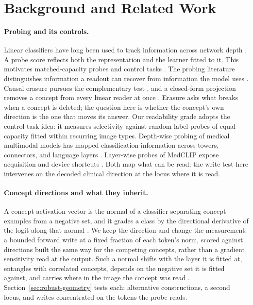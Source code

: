 \documentclass{article}
\begin{document}
\section{Background and Related Work}
\label{sec:related}

\paragraph{Probing and its controls.}
Linear classifiers have long been used to track information across network depth \citep{alain2017understanding}. A probe score reflects both the representation and the learner fitted to it. This motivates matched-capacity probes and control tasks \citep{hewitt2019designing}. The probing literature distinguishes information a readout can recover from information the model uses \citep{belinkov2022probing,ravichander2021probing}. Causal erasure pursues the complementary test \citep{ravfogel2020null,elazar2021amnesic}, and a closed-form projection removes a concept from every linear reader at once \citep{belrose2023leace}. Erasure asks what breaks when a concept is deleted; the question here is whether the concept's own direction is the one that moves its answer. Our readability grade adopts the control-task idea: it measures selectivity against random-label probes of equal capacity fitted within recurring image types. Depth-wise probing of medical multimodal models has mapped classification information across towers, connectors, and language layers \citep{zhu2026lost}. Layer-wise probes of MedCLIP expose acquisition and device shortcuts \citep{pedersen2026probes}. Both map what can be read; the write test here intervenes on the decoded clinical direction at the locus where it is read.

\paragraph{Concept directions and what they inherit.}
A concept activation vector is the normal of a classifier separating concept examples from a negative set, and it grades a class by the directional derivative of the logit along that normal \citep{kim2018tcav}. We keep the direction and change the measurement: a bounded forward write at a fixed fraction of each token's norm, scored against directions built the same way for the competing concepts, rather than a gradient sensitivity read at the output. Such a normal shifts with the layer it is fitted at, entangles with correlated concepts, depends on the negative set it is fitted against, and carries where in the image the concept was read \citep{nicolson2025explaining}. Section~\ref{sec:robust-geometry} tests each: alternative constructions, a second locus, and writes concentrated on the tokens the probe reads.
\end{document}
